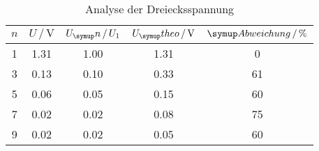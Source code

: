 \begin{table}
  \centering
  \begin{tabular}{c c c c c}
    \toprule
    $n$ & $U \,/\,\si{\volt}$ & $U_\su{n}\,/\,U_1$ & $U_\su{theo}\,/\,\si{\volt}$
    & $\su{Abweichung}\,/\, \%$ \\
    \midrule
    1   &   1.31   &  1.00  &   1.31  &   0 \\
    3   &   0.13   &  0.10  &   0.33  &   61 \\
    5   &   0.06   &  0.05  &   0.15  &   60 \\
    7   &   0.02   &  0.02  &   0.08  &   75 \\
    9   &   0.02   &  0.02  &   0.05  &   60 \\
    \bottomrule
  \end{tabular}
  \caption{Analyse der Dreiecksspannung}
  \label{tab:anadrei}
\end{table}
